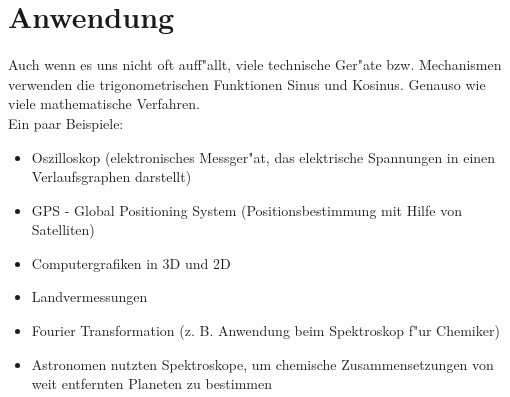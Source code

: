 \documentclass{standalone}
\begin{document}
\section{Anwendung}
Auch wenn es uns nicht oft auff{"a}llt, viele technische Ger{"a}te bzw. Mechanismen verwenden die trigonometrischen Funktionen Sinus und Kosinus. Genauso wie viele mathematische Verfahren.\\
\noindent Ein paar Beispiele:

\vspace{-\topsep}
\begin{itemize}
  \setlength{\parskip}{0pt}
  \setlength{\itemsep}{0pt plus 1pt}
  \item Oszilloskop (elektronisches Messger{"a}t, das elektrische Spannungen in einen Verlaufsgraphen darstellt) 
  \item GPS - Global Positioning System (Positionsbestimmung mit Hilfe von Satelliten)
  \item Computergrafiken in 3D und 2D
  \item Landvermessungen
  \item Fourier Transformation (z. B. Anwendung beim Spektroskop f{"u}r Chemiker)
  \item Astronomen nutzten Spektroskope, um chemische Zusammensetzungen von weit entfernten Planeten zu bestimmen
\end{itemize}
\vspace{-\topsep}
\end{document}
